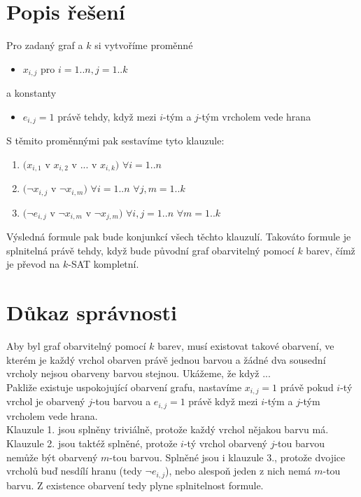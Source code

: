 \documentclass{scrartcl}
\begin{document}
\section{Popis řešení}
Pro zadaný graf a $k$ si vytvoříme proměnné

\begin{itemize}
        \item $x_{i,j}$ pro $i = 1..n, j = 1..k$
\end{itemize}

a konstanty

\begin{itemize}
        \item $e_{i,j} = 1$ právě tehdy, když mezi $i$-tým a $j$-tým vrcholem vede hrana 
\end{itemize}

S těmito proměnnými pak sestavíme tyto klauzule:
\begin{enumerate}
        \item $(x_{i,1}$ v $x_{i,2}$ v $...$ v $x_{i,k})$ $\forall i = 1..n$
        \item $(\neg x_{i,j}$ v $\neg x_{i,m})$ $\forall i = 1..n$ $\forall j,m = 1..k$ 
        \item $(\neg e_{i,j}$ v $\neg x_{i, m}$ v $\neg x_{j,m})$ $\forall i,j = 1..n$ $\forall m = 1..k$
\end{enumerate}

Výsledná formule pak bude konjunkcí všech těchto klauzulí. Takováto formule je splnitelná právě tehdy, když bude původní graf obarvitelný pomocí $k$ barev, čímž je převod na $k$-SAT kompletní.

\section{Důkaz správnosti}
Aby byl graf obarvitelný pomocí $k$ barev, musí existovat takové obarvení, ve kterém je každý vrchol obarven právě jednou barvou a žádné dva sousední vrcholy nejsou obarveny barvou stejnou. Ukážeme, že když ... \\

Pakliže existuje uspokojující obarvení grafu, nastavíme $x_{i,j} = 1$ právě pokud $i$-tý vrchol je obarvený $j$-tou barvou a $e_{i,j} = 1$ právě když mezi $i$-tým a $j$-tým vrcholem vede hrana. \\

Klauzule 1. jsou splněny triviálně, protože každý vrchol nějakou barvu má. Klauzule 2. jsou taktéž splněné, protože $i$-tý vrchol obarvený $j$-tou barvou nemůže být obarvený $m$-tou barvou. Splněné jsou i klauzule 3., protože dvojice vrcholů buď nesdílí hranu (tedy $\neg e_{i,j}$), nebo alespoň jeden z nich nemá $m$-tou barvu. Z existence obarvení tedy plyne splnitelnost formule.\\
\end{document}
